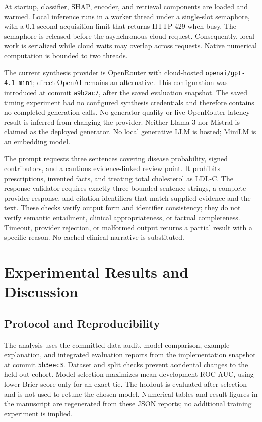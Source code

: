 \documentclass[journal]{IEEEtran}
\begin{document}
At startup, classifier, SHAP, encoder, and retrieval components are loaded and warmed. Local inference runs in a worker thread under a single-slot semaphore, with a 0.1-second acquisition limit that returns HTTP 429 when busy. The semaphore is released before the asynchronous cloud request. Consequently, local work is serialized while cloud waits may overlap across requests. Native numerical computation is bounded to two threads.

The current synthesis provider is OpenRouter with cloud-hosted \texttt{openai/gpt-4.1-mini}; direct OpenAI remains an alternative. This configuration was introduced at commit \texttt{a9b2ac7}, after the saved evaluation snapshot. The saved timing experiment had no configured synthesis credentials and therefore contains no completed generation calls. No generator quality or live OpenRouter latency result is inferred from changing the provider. Neither Llama-3 nor Mistral is claimed as the deployed generator. No local generative LLM is hosted; MiniLM is an embedding model.

The prompt requests three sentences covering disease probability, signed contributors, and a cautious evidence-linked review point. It prohibits prescriptions, invented facts, and treating total cholesterol as LDL-C. The response validator requires exactly three bounded sentence strings, a complete provider response, and citation identifiers that match supplied evidence and the text. These checks verify output form and identifier consistency; they do not verify semantic entailment, clinical appropriateness, or factual completeness. Timeout, provider rejection, or malformed output returns a partial result with a specific reason. No cached clinical narrative is substituted.

\section{Experimental Results and Discussion}
\subsection{Protocol and Reproducibility}
The analysis uses the committed data audit, model comparison, example explanation, and integrated evaluation reports from the implementation snapshot at commit \texttt{5b3eec3}. Dataset and split checks prevent accidental changes to the held-out cohort. Model selection maximizes mean development ROC-AUC, using lower Brier score only for an exact tie. The holdout is evaluated after selection and is not used to retune the chosen model. Numerical tables and result figures in the manuscript are regenerated from these JSON reports; no additional training experiment is implied.
\end{document}
